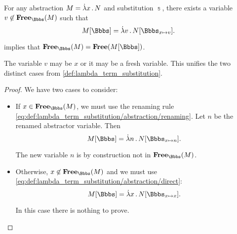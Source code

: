 \begin{proposition}\label{thm:lambda_substitution_single_rule}
  For any abstraction \( M = \qabs x N \) and substitution \( \Bbbs \), there exists a variable \( v \not\in \op*{Free}_\Bbbs(M) \) such that
  \begin{equation}\label{eq:thm:lambda_substitution_single_rule}
    M[\Bbbs] = \qabs v N[\Bbbs_{x \mapsto v}].
  \end{equation}
\end{proposition}
\begin{comments}
  \item {} implies that \( \op*{Free}_\Bbbs(M) = \op*{Free}(M[\Bbbs]) \).

  \item The variable \( v \) may be \( x \) or it may be a fresh variable. This unifies the two distinct cases from \cref{def:lambda_term_substitution}.
\end{comments}
\begin{proof}
  We have two cases to consider:
  \begin{itemize}
    \item If \( x \in \op*{Free}_\Bbbs(M) \), we must use the renaming rule \eqref{eq:def:lambda_term_substitution/abstraction/renaming}. Let \( n \) be the renamed abstractor variable. Then
    \begin{equation*}
      M[\Bbbs] = \qabs n N[\Bbbs_{x \mapsto n}].
    \end{equation*}

    The new variable \( n \) is by construction not in \( \op*{Free}_\Bbbs(M) \).

    \item Otherwise, \( x \not\in \op*{Free}_\Bbbs(M) \) and we must use \eqref{eq:def:lambda_term_substitution/abstraction/direct}:
    \begin{equation*}
      M[\Bbbs] = \qabs x N[\Bbbs_{x \mapsto x}].
    \end{equation*}

    In this case there is nothing to prove.
  \end{itemize}
\end{proof}

